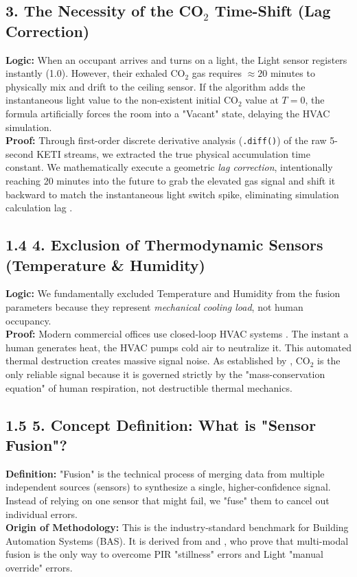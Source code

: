 \documentclass[11pt,a4paper]{article}
\begin{document}
\subsection{3. The Necessity of the CO$_2$ Time-Shift (Lag Correction)}
\textbf{Logic:} When an occupant arrives and turns on a light, the Light sensor registers instantly (1.0). However, their exhaled CO$_2$ gas requires $\approx 20$ minutes to physically mix and drift to the ceiling sensor. If the algorithm adds the instantaneous light value to the non-existent initial CO$_2$ value at $T=0$, the formula artificially forces the room into a "Vacant" state, delaying the HVAC simulation. \\
\textbf{Proof:} Through first-order discrete derivative analysis (\texttt{.diff()}) of the raw 5-second KETI streams, we extracted the true physical accumulation time constant. We mathematically execute a geometric \textit{lag correction}, intentionally reaching 20 minutes into the future to grab the elevated gas signal and shift it backward to match the instantaneous light switch spike, eliminating simulation calculation lag \cite{aswani2012}.

\subsection{1.4 4. Exclusion of Thermodynamic Sensors (Temperature \& Humidity)}
\textbf{Logic:} We fundamentally excluded Temperature and Humidity from the fusion parameters because they represent \textit{mechanical cooling load}, not human occupancy. \\
\textbf{Proof:} Modern commercial offices use closed-loop HVAC systems \cite{chen2018building}. The instant a human generates heat, the HVAC pumps cold air to neutralize it. This automated thermal destruction creates massive signal noise. As established by \cite{sun2020review}, CO$_2$ is the only reliable signal because it is governed strictly by the "mass-conservation equation" of human respiration, not destructible thermal mechanics.

\subsection{1.5 5. Concept Definition: What is "Sensor Fusion"?}
\textbf{Definition:} "Fusion" is the technical process of merging data from multiple independent sources (sensors) to synthesize a single, higher-confidence signal. Instead of relying on one sensor that might fail, we "fuse" them to cancel out individual errors. \\
\textbf{Origin of Methodology:} This is the industry-standard benchmark for Building Automation Systems (BAS). It is derived from \cite{sun2020review} and \cite{chen2018building}, who prove that multi-modal fusion is the only way to overcome PIR "stillness" errors and Light "manual override" errors.
\end{document}
